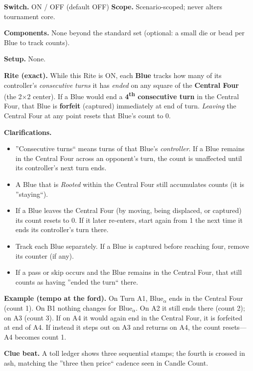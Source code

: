 \documentclass[11pt]{article}
\numberwithin{equation}{section} %
\theoremstyle{plain} %
\theoremstyle{definition} %
\theoremstyle{remark} %
\begin{document}
\medskip
\noindent\textbf{Switch.} \textsc{ON / OFF} (default \textsc{OFF}) \hfill \textbf{Scope.} Scenario-scoped; never alters tournament core.

\medskip
\noindent\textbf{Components.} None beyond the standard set (optional: a small die or bead per Blue to track counts).

\medskip
\noindent\textbf{Setup.} None.

\medskip
\noindent\textbf{Rite (exact).} While this Rite is \textsc{ON}, each \textbf{Blue} tracks how many of its controller's \emph{consecutive turns} it has \emph{ended} on any square of the \textbf{Central Four} (the 2\(\times\)2 center). If a Blue would end a \textbf{4\textsuperscript{th} consecutive turn} in the Central Four, that Blue is \textbf{forfeit} (captured) immediately at end of turn. \emph{Leaving} the Central Four at any point resets that Blue's count to 0.

\medskip
\noindent\textbf{Clarifications.}
\begin{itemize}\setlength\itemsep{0.25em}
  \item ''Consecutive turns`` means turns of that Blue's \emph{controller}. If a Blue remains in the Central Four across an opponent's turn, the count is unaffected until its controller's next turn ends.
  \item A Blue that is \emph{Rooted} within the Central Four still accumulates counts (it is ''staying``).
  \item If a Blue leaves the Central Four (by moving, being displaced, or captured) its count resets to 0. If it later re-enters, start again from 1 the next time it ends its controller's turn there.
  \item Track each Blue separately. If a Blue is captured before reaching four, remove its counter (if any).
  \item If a pass or skip occurs and the Blue remains in the Central Four, that still counts as having ''ended the turn`` there.
\end{itemize}

\medskip
\noindent\textbf{Example (tempo at the ford).}  
On Turn A1, Blue\(_\alpha\) ends in the Central Four (count 1). On B1 nothing changes for Blue\(_\alpha\). On A2 it still ends there (count 2); on A3 (count 3). If on A4 it would again end in the Central Four, it is forfeited at end of A4. If instead it steps out on A3 and returns on A4, the count resets---A4 becomes count 1.

\medskip
\noindent\textbf{Clue beat.} A toll ledger shows three sequential stamps; the fourth is crossed in ash, matching the ''three then price`` cadence seen in Candle Count.
\end{document}

